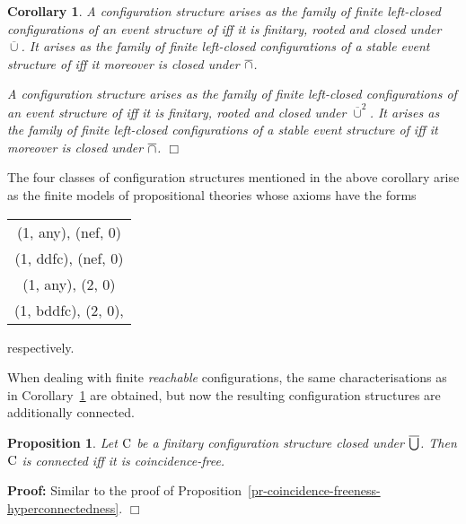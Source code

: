 \documentclass[twocolumn]{article}
\newtheorem{prop}{Proposition}[section]
\newtheorem{coro}{Corollary}
\newenvironment{proposition}[1]{\begin{prop} \rm \label{pr-#1} }{\end{prop}}
\newenvironment{corollary}[1]{\begin{coro} \rm \label{cor-#1} }{\end{coro}}
\newenvironment{proof}{\begin{trivlist} \item[\hspace{\labelsep}\bf
Proof:]}{\hfill $\Box$\end{trivlist}}
\newcommand{\pr}[1]{Proposition~\ref{pr-#1}}
\newcommand{\cor}[1]{Corollary~\ref{cor-#1}}
\begin{document}
\begin{corollary}{characterisation-Winskel finitary}
A configuration structure arises as the family of finite left-closed
configurations of an event structure of \cite{Wi87a} iff it is
finitary, rooted and closed under $\overline\cup$. It arises as the
family of finite left-closed configurations of a stable event
structure of \cite{Wi87a} iff it moreover is closed under $\overline{\cap}$.

A configuration structure arises as the family of finite left-closed
configurations of an event structure of \cite{Wi89} iff it is
finitary, rooted and closed under $\overline\cup^2$.  It arises as the
family of finite left-closed configurations of a stable event
structure of \cite{Wi89} iff it moreover is closed under $\overline{\cap}$.
\hfill $\Box$
\end{corollary}
The four classes of configuration structures mentioned in the above
corollary arise as the finite models of propositional
theories whose axioms have the forms
\begin{center}
\begin{tabular}{c}
(1, any), (nef, 0)\\
(1, ddfc), (nef, 0)\\
(1, any), (2, 0)\\
(1, bddfc), (2, 0),
\end{tabular}
\end{center}
respectively.

When dealing with finite \emph{reachable} configurations, the same
characterisations as in \cor{characterisation-Winskel finitary} are
obtained, but now the resulting configuration structures are
additionally connected.

\begin{proposition}{coincidence-freeness-connectedness}
Let ${\rm C}$ be a finitary configuration structure closed under
$\overline{\bigcup}$.  Then ${\rm C}$ is connected iff it is coincidence-free.
\end{proposition}

\begin{proof}
Similar to the proof of \pr{coincidence-freeness-hyperconnectedness}.
\pagebreak[3]
\end{proof}
\end{document}
